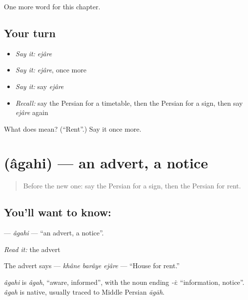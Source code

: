 \begin{grammarlens}[title={What you've built}]
One more word for this chapter.
\end{grammarlens}

\subsection*{Your turn}
\begin{itemize}
\raggedright
  \item \emph{Say it:} \emph{ejâre}
  \item \emph{Say it:} \emph{ejâre}, once more
  \item \emph{Say it:} say \emph{ejâre}
  \item \emph{Recall:} say the Persian for a timetable, then the Persian for a sign, then say \emph{ejâre} again
\end{itemize}

\begin{tcolorbox}[breakable,colback=teal!4,colframe=teal!35!black,title={Before you move on}]
What does  mean? (\textquotedblleft{}Rent\textquotedblright{}.) Say it once more.
\end{tcolorbox}
\section[\texorpdfstring{\fa{آگهی} (âgahi)}{آگهی (âgahi)}]{ (âgahi) — an advert, a notice}

\label{lesson:FA-C139-agahi}



\begin{quote}
Before the new one: say the Persian for a sign, then the Persian for rent.
\end{quote}

\subsection*{You'll want to know: }
\textbf{} — \emph{âgahi} — \textquotedblleft{}an advert, a notice\textquotedblright{}.

\emph{Read it:} the advert

The advert says \textbf{  } — \emph{khâne barâye ejâre} — \textquotedblleft{}House for rent.\textquotedblright{}

\begin{cousinweb}
\emph{âgahi} is \emph{âgah}, \textquotedblleft{}aware, informed\textquotedblright{}, with the noun ending \emph{-i}: \textquotedblleft{}information, notice\textquotedblright{}. \emph{âgah} is native, usually traced to Middle Persian \emph{āgāh}.
\end{cousinweb}

